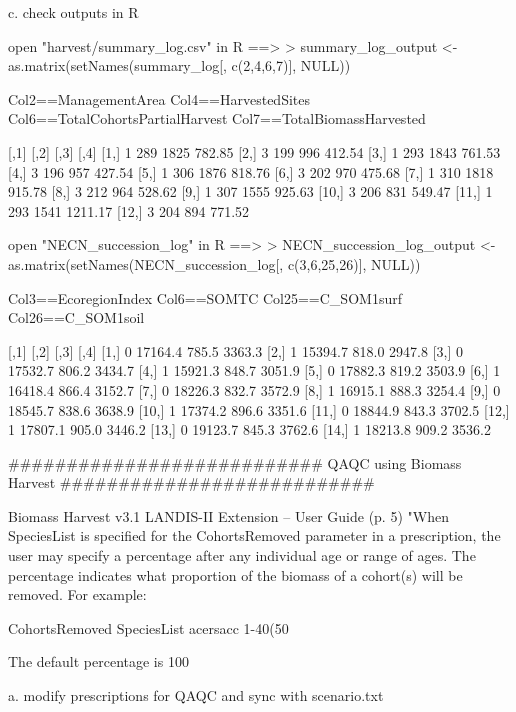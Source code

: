 	c. check outputs in R

open "harvest/summary_log.csv" in R ==>
> summary_log_output <- as.matrix(setNames(summary_log[, c(2,4,6,7)], NULL))

Col2==ManagementArea
Col4==HarvestedSites
Col6==TotalCohortsPartialHarvest
Col7==TotalBiomassHarvested

       [,1] [,2] [,3]    [,4]
 [1,]    1  289 1825  782.85
 [2,]    3  199  996  412.54
 [3,]    1  293 1843  761.53
 [4,]    3  196  957  427.54
 [5,]    1  306 1876  818.76
 [6,]    3  202  970  475.68
 [7,]    1  310 1818  915.78
 [8,]    3  212  964  528.62
 [9,]    1  307 1555  925.63
[10,]    3  206  831  549.47
[11,]    1  293 1541 1211.17
[12,]    3  204  894  771.52



open "NECN_succession_log" in R ==>
> NECN_succession_log_output <- as.matrix(setNames(NECN_succession_log[, c(3,6,25,26)], NULL))

Col3==EcoregionIndex
Col6==SOMTC
Col25==C_SOM1surf
Col26==C_SOM1soil

       [,1]    [,2]  [,3]   [,4]
 [1,]    0 17164.4 785.5 3363.3
 [2,]    1 15394.7 818.0 2947.8
 [3,]    0 17532.7 806.2 3434.7
 [4,]    1 15921.3 848.7 3051.9
 [5,]    0 17882.3 819.2 3503.9
 [6,]    1 16418.4 866.4 3152.7
 [7,]    0 18226.3 832.7 3572.9
 [8,]    1 16915.1 888.3 3254.4
 [9,]    0 18545.7 838.6 3638.9
[10,]    1 17374.2 896.6 3351.6
[11,]    0 18844.9 843.3 3702.5
[12,]    1 17807.1 905.0 3446.2
[13,]    0 19123.7 845.3 3762.6
[14,]    1 18213.8 909.2 3536.2





###########################
QAQC using Biomass Harvest
###########################

Biomass Harvest v3.1 LANDIS-II Extension – User Guide (p. 5)	
"When SpeciesList is specified for the CohortsRemoved parameter in a prescription, the user may specify a percentage after any individual age or range of ages. The percentage indicates what proportion of the biomass of a cohort(s) will be removed. For example:

CohortsRemoved SpeciesList
acersacc 1-40(50%

The default percentage is 100%


	a. modify prescriptions for QAQC and sync with scenario.txt


